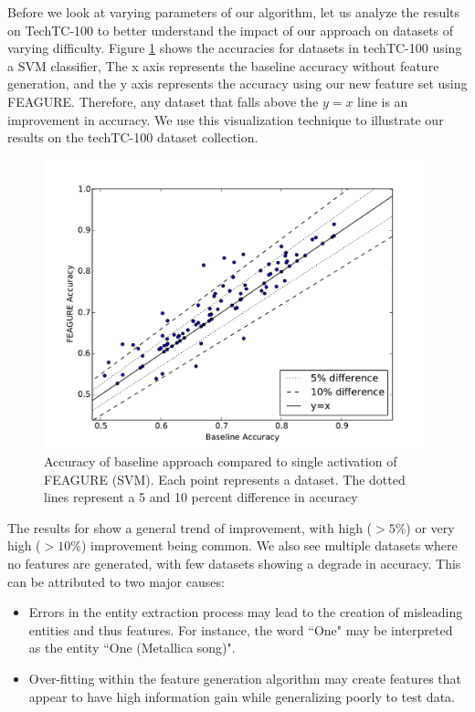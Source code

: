 \documentclass[twoside,11pt]{article}
\theoremstyle{definition}
\begin{document}
Before we look at varying parameters of our algorithm, let us analyze the results on TechTC-100 to better understand the impact of our approach on datasets of varying difficulty. Figure \ref{fig:svm_base_lvl1} shows the accuracies for datasets in techTC-100 using a SVM classifier, The x axis represents the baseline accuracy without feature generation, and the y axis represents the accuracy using our new feature set using FEAGURE. Therefore, any dataset that falls above the $y=x$ line is an improvement in accuracy. We use this visualization technique to illustrate our results on the techTC-100 dataset collection.

\begin{figure}
	\centering
	\includegraphics[width=0.8\linewidth]{new_svm_10_base_vs_lvl1}
	\caption{Accuracy of
		baseline approach compared to single activation of FEAGURE (SVM). Each point represents a dataset. The dotted lines represent a 5 and 10 percent difference in accuracy}
	\label{fig:svm_base_lvl1}
\end{figure}

The results for show a general trend of improvement, with high ($> 5\%$) or very high ($>10\%$) improvement being common. We also see multiple datasets where no features are generated, with few datasets showing a degrade in accuracy.
This can be attributed to two major causes:
\begin{itemize}
	\item Errors in the entity extraction process may lead to the creation of misleading entities and thus features. For instance, the word ``One" may be interpreted as the entity ``One (Metallica song)". 
	\item Over-fitting within the feature generation algorithm may create features that appear to have high information gain while generalizing poorly to test data.
\end{itemize}
\end{document}
